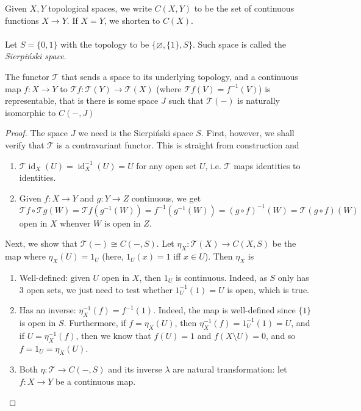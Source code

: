 \documentclass{treatise}
\begin{document}
Given $X, Y$ topological spaces, we write $C(X, Y)$ to be the set of continuous functions $X \to Y$. If $X = Y$, we shorten to $C(X)$.
\\
\\
Let $S = \{ 0, 1 \}$ with the topology to be $\{ \varnothing, \{ 1 \}, S \}$. Such space is called the \emph{Sierpiński space}.
\begin{theorem}
The functor $\mathcal{T}$ that sends a space to its underlying topology, and a continuous map $f: X \to Y$ to $\mathcal{T}f: \mathcal{T}(Y) \to \mathcal{T}(X)$ (where $\mathcal{T}f(V) = f^{-1}(V)$) is representable, that is there is some space $J$ such that $\mathcal{T}(-)$ is naturally isomorphic to $C(-, J)$
\end{theorem}
\begin{proof}
The space $J$ we need is the Sierpiński space $S$. First, however, we shall verify that $\mathcal{T}$ is a contravariant functor. This is straight from construction and
\begin{enumerate}
    \item $\mathcal{T}\operatorname{id}_X (U) = \operatorname{id}_X^{-1}(U) = U$ for any open set $U$, i.e. $\mathcal{T}$ maps identities to identities.
    \item Given $f: X \to Y$ and $g: Y \to Z$ continuous, we get $\mathcal{T}f \circ \mathcal{T}g (W) = \mathcal{T}f(g^{-1}(W)) = f^{-1}(g^{-1}(W)) = (g \circ f)^{-1}(W) = \mathcal{T}(g \circ f) (W)$ open in $X$ whenver $W$ is open in $Z$.
\end{enumerate}
Next, we show that $\mathcal{T}(-) \cong C(-, S)$. Let $\eta_X : \mathcal{T}(X) \to C(X, S)$ be the map where $\eta_X (U) = 1_U$ (here, $1_U(x) = 1$ iff $x \in U$). Then $\eta_X$ is
\begin{enumerate}
    \item Well-defined: given $U$ open in $X$, then $1_U$ is continuous. Indeed, as $S$ only has 3 open sets, we just need to test whether $1_U^{-1}(1) = U$ is open, which is true.
    \item Has an inverse: $\eta_X^{-1}(f) = f^{-1}(1)$. Indeed, the map is well-defined since $\{ 1 \}$ is open in $S$. Furthermore, if $f = \eta_X (U)$, then $\eta_X^{-1}(f) = 1_U^{-1}(1) = U$, and if $U = \eta_X^{-1}(f)$, then we know that $f(U) = 1$ and $f(X \setminus U) = 0$, and so $f = 1_U = \eta_X(U)$.
    \item Both $\eta: \mathcal{T} \to C(-, S)$ and its inverse $\lambda$ are natural transformation: let $f: X \to Y$ be a continuous map.
    \begin{enumerate}

\end{enumerate}
\end{enumerate}
\end{proof}
\end{document}
